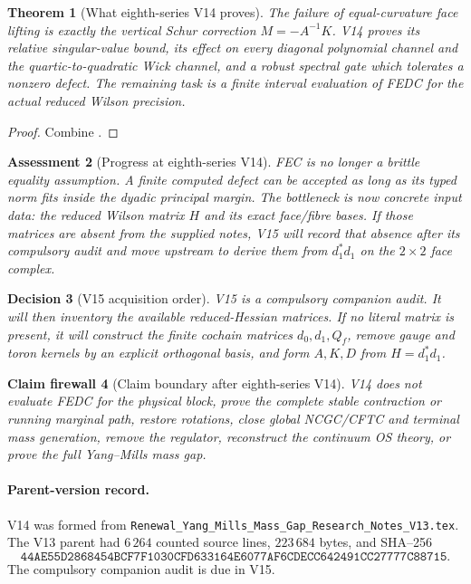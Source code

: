 \documentclass[11pt,oneside]{book}
\newtheorem{theorem}{Theorem}[chapter]
\newtheorem{assessment}[theorem]{Assessment}
\newtheorem{firewall}[theorem]{Claim firewall}
\newtheorem{decision}[theorem]{Decision}
\theoremstyle{definition}
\theoremstyle{remark}
\begin{document}
\begin{theorem}[What eighth-series V14 proves]
\label{thm:e8v14-result}
The failure of equal-curvature face lifting is exactly the vertical
Schur correction \(M=-A^{-1}K\).  V14 proves its relative
singular-value bound, its effect on every diagonal polynomial channel
and the quartic-to-quadratic Wick channel, and a robust spectral gate
which tolerates a nonzero defect.  The remaining task is a finite
interval evaluation of FEDC for the actual reduced Wilson precision.
\end{theorem}

\begin{proof}
Combine
.
\end{proof}

\begin{assessment}[Progress at eighth-series V14]
\label{ass:e8v14-status}
FEC is no longer a brittle equality assumption.  A finite computed
defect can be accepted as long as its typed norm fits inside the
dyadic principal margin.  The bottleneck is now concrete input data:
the reduced Wilson matrix \(H\) and its exact face/fibre bases.
If those matrices are absent from the supplied notes, V15 will record
that absence after its compulsory audit and move upstream to derive
them from \(d_1^*d_1\) on the \(2\times2\) face complex.
\end{assessment}

\begin{decision}[V15 acquisition order]
\label{dec:e8v14-V15}
V15 is a compulsory companion audit.  It will then inventory the
available reduced-Hessian matrices.  If no literal matrix is present,
it will construct the finite cochain matrices \(d_0,d_1,Q_f\), remove
gauge and toron kernels by an explicit orthogonal basis, and form
\(A,K,D\) from \(H=d_1^*d_1\).
\end{decision}

\begin{firewall}[Claim boundary after eighth-series V14]
\label{fire:e8v14-claim}
V14 does not evaluate FEDC for the physical block, prove the complete
stable contraction or running marginal path, restore rotations,
close global NCGC/CFTC and terminal mass generation, remove the
regulator, reconstruct the continuum OS theory, or prove the full
Yang--Mills mass gap.
\end{firewall}

\paragraph{Parent-version record.}
V14 was formed from
\texttt{Renewal\_Yang\_Mills\_Mass\_Gap\_Research\_Notes\_V13.tex}.
The V13 parent had \(6\,264\) counted source lines,
\(223\,684\) bytes, and SHA--256
\[
\texttt{44AE55D2868454BCF7F1030CFD633164E6077AF6CDECC642491CC27777C88715}.
\]
The compulsory companion audit is due in V15.
\end{document}
